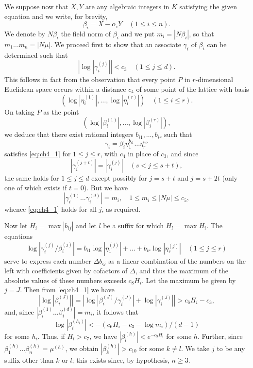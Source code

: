 We suppose now that $X, Y$ are any algebraic integers in $K$ satisfying the given equation and we write, for brevity,
\[
\beta_i = X - \alpha_i Y \quad (1 \le i \le n).
\]
We denote by $N\beta_i$ the field norm of $\beta_i$ and we put $m_i = |N\beta_i|$, so that $m_1\dots m_n = |N\mu|$. We proceed first to show that an associate $\gamma_i$ of $\beta_i$ can be determined such that
\begin{equation} \label{eq:ch4_1}\tag{1}
\left|\log\left|\gamma_i^{(j)}\right|\right| < c_3 \quad (1 \le j \le d).
\end{equation}
This follows in fact from the observation that every point $P$ in $r$-dimensional Euclidean space occurs within a distance $c_4$ of some point of the lattice with basis
\[
(\log |\eta_i^{(1)}|, \dots, \log |\eta_i^{(r)}|) \quad (1 \le i \le r).
\]
On taking $P$ as the point
\[
(\log |\beta_i^{(1)}|, \dots, \log |\beta_i^{(r)}|),
\]
we deduce that there exist rational integers $b_{i1}, \dots, b_{ir}$ such that
\begin{equation} \label{eq:ch4_2}\tag{2}
\gamma_i = \beta_i \eta_1^{b_{i1}} \dots \eta_r^{b_{ir}}
\end{equation}
satisfies \eqref{eq:ch4_1} for $1 \le j \le r$, with $c_4$ in place of $c_3$, and since
\[
\left|\gamma_i^{(j+t)}\right| = \left|\gamma_i^{(j)}\right| \quad (s < j \le s+t),
\]
the same holds for $1 \le j \le d$ except possibly for $j = s + t$ and $j = s + 2t$ (only one of which exists if $t = 0$). But we have
\[
\left|\gamma_i^{(1)}\dots\gamma_i^{(d)}\right| = m_i, \quad 1 \le m_i \le \left|N\mu\right| \le c_5,
\]
whence \eqref{eq:ch4_1} holds for all $j$, as required.

Now let $H_i = \max |b_{ij}|$ and let $l$ be a suffix for which $H_l = \max H_i$. The equations
\[
\log \left|\gamma_i^{(j)}/\beta_i^{(j)}\right| = b_{i1} \log \left|\eta_1^{(j)}\right| + \dots + b_{ir} \log \left|\eta_r^{(j)}\right| \quad (1 \le j \le r)
\]
serve to express each number $\Delta b_{ij}$ as a linear combination of the numbers on the left with coefficients given by cofactors of $\Delta$, and thus the maximum of the absolute values of these numbers exceeds $c_8H_i$. Let the maximum be given by $j=J$. Then from \eqref{eq:ch4_1} we have
\[
\left|\log\left|\beta_i^{(J)}\right|\right| = \left|\log\left|\beta_i^{(J)}/\gamma_i^{(J)}\right| + \log\left|\gamma_i^{(J)}\right|\right| > c_6H_i - c_3,
\]
and, since $|\beta_i^{(1)} \dots \beta_i^{(d)}| = m_i$, it follows that
\[
\log \left|\beta_i^{(h_i)}\right| < -(c_6 H_i - c_3 - \log m_i)/(d-1)
\]
for some $h_i$. Thus, if $H_l > c_7$, we have $|\beta_l^{(h)}| < e^{-c_9 H_l}$ for some $h$. Further, since $\beta_1^{(h)} \dots \beta_n^{(h)} = \mu^{(h)}$, we obtain $|\beta_k^{(h)}| > c_{10}$ for some $k \neq l$. We take $j$ to be any suffix other than $k$ or $l$; this exists since, by hypothesis, $n \ge 3$.

